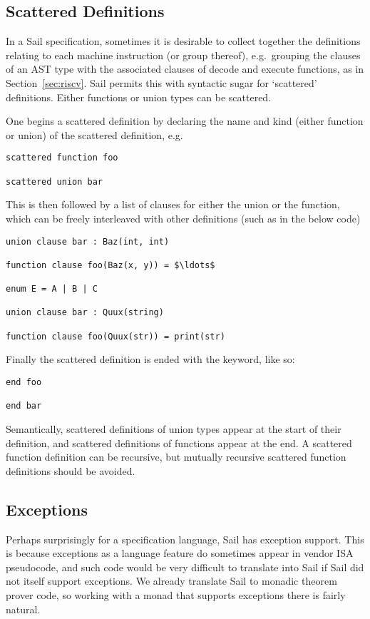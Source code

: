 \subsection{Scattered Definitions}
\label{sec:scattered}
In a Sail specification, sometimes it is desirable to collect together
the definitions relating to each machine instruction (or group
thereof), e.g.~grouping the clauses of an AST type with the associated
clauses of decode and execute functions, as in
Section~\ref{sec:riscv}. Sail permits this with syntactic sugar for
`scattered' definitions. Either functions or union types can be
scattered.

One begins a scattered definition by declaring the name and kind
(either function or union) of the scattered definition, e.g.
\begin{lstlisting}
scattered function foo

scattered union bar
\end{lstlisting}
This is then followed by a list of clauses for either the union or the
function, which can be freely interleaved with other definitions (such
as  in the below code)
\begin{lstlisting}[mathescape]
union clause bar : Baz(int, int)

function clause foo(Baz(x, y)) = $\ldots$

enum E = A | B | C

union clause bar : Quux(string)

function clause foo(Quux(str)) = print(str)
\end{lstlisting}
Finally the scattered definition is ended with the  keyword, like so:
\begin{lstlisting}
end foo

end bar
\end{lstlisting}

Semantically, scattered definitions of union types appear at the start
of their definition, and scattered definitions of functions appear at
the end. A scattered function definition can be recursive, but
mutually recursive scattered function definitions should be avoided.

\subsection{Exceptions}
\label{sec:exn}

Perhaps surprisingly for a specification language, Sail has exception
support. This is because exceptions as a language feature do sometimes
appear in vendor ISA pseudocode, and such code would be very difficult
to translate into Sail if Sail did not itself support exceptions. We
already translate Sail to monadic theorem prover code, so working with
a monad that supports exceptions there is fairly natural.

